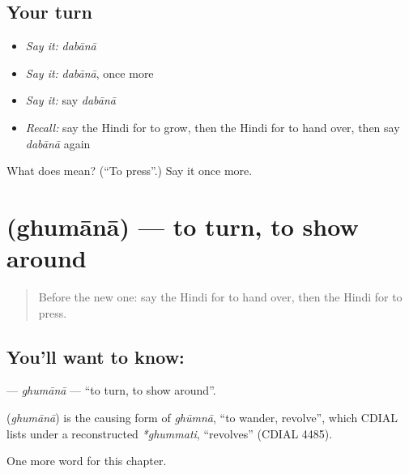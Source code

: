 \subsection*{Your turn}
\begin{itemize}
\raggedright
  \item \emph{Say it:} \emph{dabānā}
  \item \emph{Say it:} \emph{dabānā}, once more
  \item \emph{Say it:} say \emph{dabānā}
  \item \emph{Recall:} say the Hindi for to grow, then the Hindi for to hand over, then say \emph{dabānā} again
\end{itemize}

\begin{tcolorbox}[breakable,colback=teal!4,colframe=teal!35!black,title={Before you move on}]
What does  mean? (\textquotedblleft{}To press\textquotedblright{}.) Say it once more.
\end{tcolorbox}
\section[\texorpdfstring{\hi{घुमाना} (ghumānā)}{घुमाना (ghumānā)}]{ (ghumānā) — to turn, to show around}

\label{lesson:HI-C228-ghumana}



\begin{quote}
Before the new one: say the Hindi for to hand over, then the Hindi for to press.
\end{quote}

\subsection*{You'll want to know: }
\textbf{} — \emph{ghumānā} — \textquotedblleft{}to turn, to show around\textquotedblright{}.

\begin{cousinweb}
\textbf{} (\emph{ghumānā}) is the causing form of \emph{ghūmnā}, \textquotedblleft{}to wander, revolve\textquotedblright{}, which CDIAL lists under a reconstructed \emph{*ghummati}, \textquotedblleft{}revolves\textquotedblright{} (CDIAL 4485).
\end{cousinweb}

\begin{grammarlens}[title={What you've built}]
One more word for this chapter.
\end{grammarlens}

